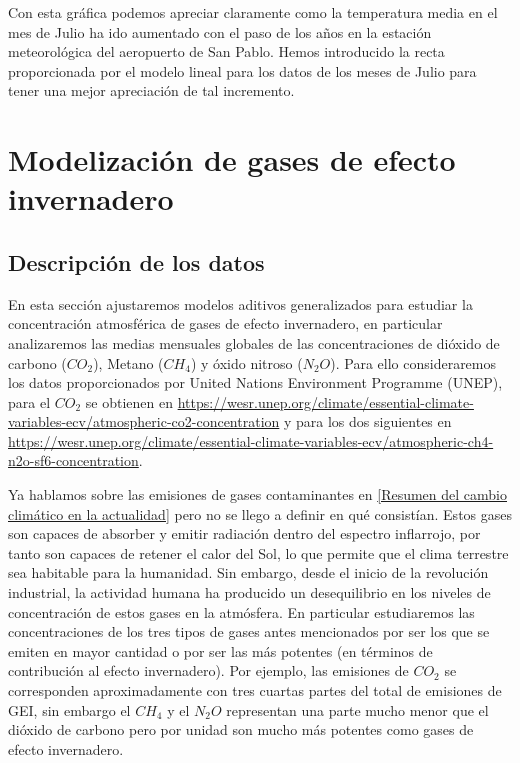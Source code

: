 \documentclass[12pt,a4paper,]{book}
\numberwithin{dummy}{section}
\theoremstyle{ocrenumbox}
\theoremstyle{blacknumex}
\theoremstyle{blacknumbox}
\theoremstyle{ocrenum}
\theoremstyle{ocrenum}
\begin{document}
Con esta gráfica podemos apreciar claramente como la temperatura media
en el mes de Julio ha ido aumentado con el paso de los años en la
estación meteorológica del aeropuerto de San Pablo. Hemos introducido la
recta proporcionada por el modelo lineal para los datos de los meses de
Julio para tener una mejor apreciación de tal incremento.

\hypertarget{modelizaciuxf3n-de-gases-de-efecto-invernadero}{%
\section{Modelización de gases de efecto
invernadero}\label{modelizaciuxf3n-de-gases-de-efecto-invernadero}}

\hypertarget{descripciuxf3n-de-los-datos}{%
\subsection{Descripción de los
datos}\label{descripciuxf3n-de-los-datos}}

En esta sección ajustaremos modelos aditivos generalizados para estudiar
la concentración atmosférica de gases de efecto invernadero, en
particular analizaremos las medias mensuales globales de las
concentraciones de dióxido de carbono (\(CO_2\)), Metano (\(CH_4\)) y
óxido nitroso (\(N_2O\)). Para ello consideraremos los datos
proporcionados por United Nations Environment Programme (UNEP), para el
\(CO_2\) se obtienen en
\url{https://wesr.unep.org/climate/essential-climate-variables-ecv/atmospheric-co2-concentration}
y para los dos siguientes en
\url{https://wesr.unep.org/climate/essential-climate-variables-ecv/atmospheric-ch4-n2o-sf6-concentration}.

Ya hablamos sobre las emisiones de gases contaminantes en
\ref{Resumen del cambio climático en la actualidad} pero no se llego a
definir en qué consistían. Estos gases son capaces de absorber y emitir
radiación dentro del espectro inflarrojo, por tanto son capaces de
retener el calor del Sol, lo que permite que el clima terrestre sea
habitable para la humanidad. Sin embargo, desde el inicio de la
revolución industrial, la actividad humana ha producido un desequilibrio
en los niveles de concentración de estos gases en la atmósfera. En
particular estudiaremos las concentraciones de los tres tipos de gases
antes mencionados por ser los que se emiten en mayor cantidad o por ser
las más potentes (en términos de contribución al efecto invernadero).
Por ejemplo, las emisiones de \(CO_2\) se corresponden aproximadamente
con tres cuartas partes del total de emisiones de GEI, sin embargo el
\(CH_4\) y el \(N_2O\) representan una parte mucho menor que el dióxido
de carbono pero por unidad son mucho más potentes como gases de efecto
invernadero.
\end{document}
